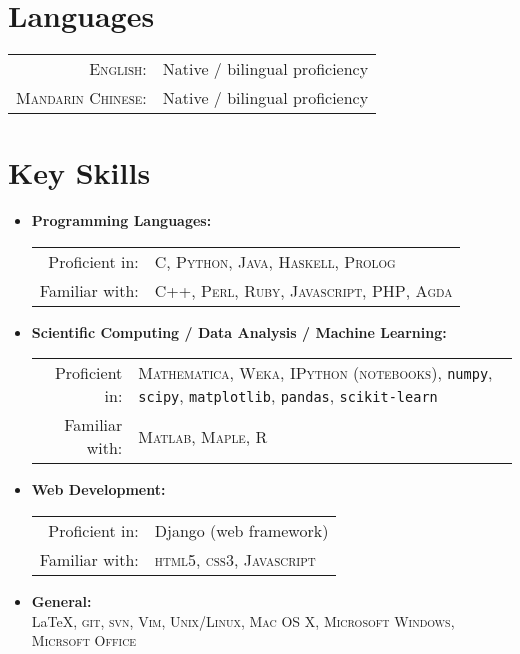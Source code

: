 \documentclass[a4paper,10pt]{article} %
\begin{document}

\section{Languages}

\begin{tabular}{rl}
\textsc{English:} & Native / bilingual proficiency\\
\textsc{Mandarin Chinese:} & Native / bilingual proficiency\\
\end{tabular}


\section{Key Skills}

\begin{itemize}
\item \textbf{Programming Languages:}\\
\begin{tabular}{rl}
Proficient in: & \textsc{C}, \textsc{Python}, \textsc{Java}, \textsc{Haskell}, \textsc{Prolog}\\
Familiar with: & \textsc{C++}, \textsc{Perl}, \textsc{Ruby}, \textsc{Javascript}, \textsc{PHP}, \textsc{Agda}
\end{tabular}
\item \textbf{Scientific Computing / Data Analysis / Machine Learning:}\\
\begin{tabular}{rp{10cm}}
Proficient in: & \textsc{Mathematica}, \textsc{Weka}, \textsc{IPython (notebooks)}, \texttt{numpy}, \texttt{scipy}, \texttt{matplotlib}, \texttt{pandas}, \texttt{scikit-learn} \\
Familiar with: & \textsc{Matlab}, \textsc{Maple}, \textsc{R}
\end{tabular}
\item \textbf{Web Development:}\\
\begin{tabular}{rl}
Proficient in: & Django (web framework)\\
Familiar with: & \textsc{html5}, \textsc{css3}, \textsc{Javascript}
\end{tabular}
\item \textbf{General:}\\
\fb \LaTeX, \textsc{git}, \textsc{svn}, \textsc{Vim}, \textsc{Unix/Linux}, \textsc{Mac OS X}, \textsc{Microsoft Windows}, \textsc{Micrsoft Office}
\end{itemize}
\end{document}
